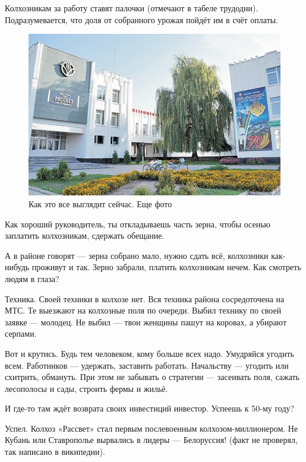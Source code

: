 Колхозникам за работу ставят палочки (отмечают в табеле трудодни). Подразумевается, что доля от собранного урожая пойдёт им в счёт оплаты.
\begin{figure}[h!tb] 
	\centering\includegraphics[scale=0.6]{Orlovskiy/91GAr5Oq6nA.jpg}
	\caption{Как это все выглядит сейчас. Еще фото}%
\end{figure}
Как хороший руководитель, ты откладываешь часть зерна, чтобы осенью заплатить колхозникам, сдержать обещание.

А в районе говорят — зерна собрано мало, нужно сдать всё, колхозники как-нибудь проживут и так. Зерно забрали, платить колхозникам нечем. Как смотреть людям в глаза?

Техника. Своей техники в колхозе нет. Вся техника района сосредоточена на МТС. Те выезжают на колхозные поля по очереди. Выбил технику по своей заявке — молодец. Не выбил — твои женщины пашут на коровах, а убирают серпами.

Вот и крутись. Будь тем человеком, кому больше всех надо. Умудряйся угодить всем. Работников — удержать, заставить работать. Начальству — угодить или схитрить, обмануть. При этом не забывать о стратегии — засеивать поля, сажать лесополосы и сады, строить фермы и жильё.

И где-то там ждёт возврата своих инвестиций инвестор. Успеешь к 50-му году?

Успел. Колхоз «Рассвет» стал первым послевоенным колхозом-миллионером. Не Кубань или Ставрополье вырвались в лидеры — Белоруссия! (факт не проверял, так написано в википедии).

